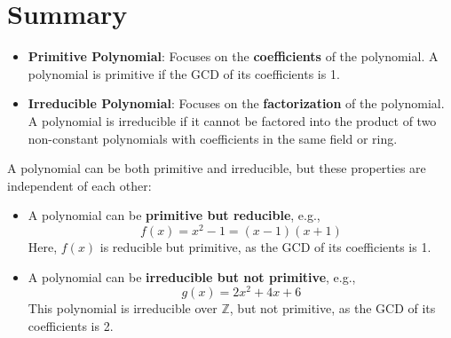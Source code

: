 \documentclass{article}
\begin{document}
\section*{Summary}
\begin{itemize}
    \item \textbf{Primitive Polynomial}: Focuses on the \textbf{coefficients} of the polynomial. A polynomial is primitive if the GCD of its coefficients is 1.
    \item \textbf{Irreducible Polynomial}: Focuses on the \textbf{factorization} of the polynomial. A polynomial is irreducible if it cannot be factored into the product of two non-constant polynomials with coefficients in the same field or ring.
\end{itemize}

A polynomial can be both primitive and irreducible, but these properties are independent of each other:
\begin{itemize}
    \item A polynomial can be \textbf{primitive but reducible}, e.g., 
    \[
    f(x) = x^2 - 1 = (x - 1)(x + 1)
    \]
    Here, $f(x)$ is reducible but primitive, as the GCD of its coefficients is 1.
    
    \item A polynomial can be \textbf{irreducible but not primitive}, e.g.,
    \[
    g(x) = 2x^2 + 4x + 6
    \]
    This polynomial is irreducible over $\mathbb{Z}$, but not primitive, as the GCD of its coefficients is 2.
\end{itemize}


\end{document}
